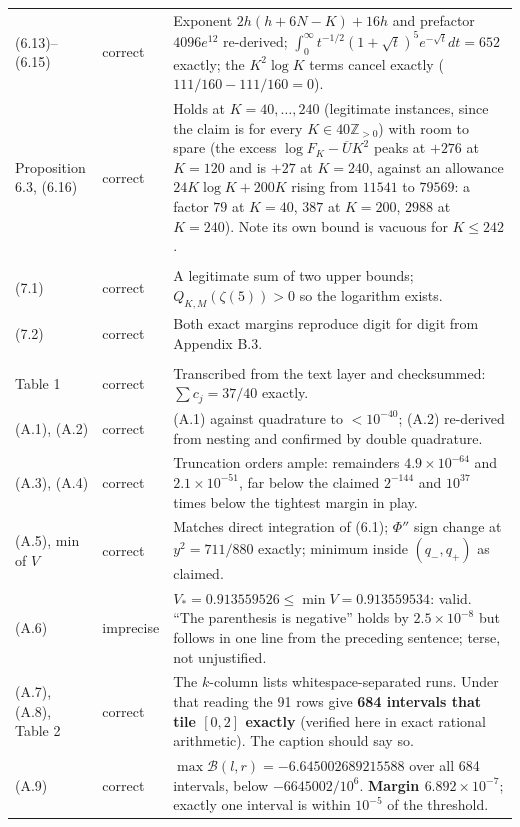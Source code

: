 \documentclass[11pt]{article}
\theoremstyle{definition}
\newcommand{\z}{\zeta(5)}
\newcommand{\Ub}{\overline{U}}
\newcommand{\OK}{correct}
\newcommand{\IM}{imprecise}
\begin{document}
\begin{longtable}{@{}p{2.55cm}p{1.75cm}p{9.5cm}@{}}
(6.13)--(6.15) & \OK & Exponent $2h(h{+}6N{-}K)+16h$ and prefactor $4096e^{12}$ re-derived; $\int_0^\infty t^{-1/2}(1+\sqrt t)^5e^{-\sqrt t}dt=652$ exactly; the $K^2\log K$ terms cancel exactly ($111/160-111/160=0$). \\
Proposition 6.3, (6.16) & \OK & Holds at $K=40,\dots,240$ (legitimate instances, since the claim is for every $K\in40\mathbb{Z}_{>0}$) with room to spare (the excess $\log F_K-\Ub K^2$ peaks at $+276$ at $K=120$ and is $+27$ at $K=240$, against an allowance $24K\log K+200K$ rising from $11541$ to $79569$: a factor $79$ at $K=40$, $387$ at $K=200$, $2988$ at $K=240$). Note its own bound is vacuous for $K\le242$. \\
\addlinespace
\multicolumn{3}{@{}l}{\textbf{Section 7}}\\
(7.1) & \OK & A legitimate sum of two upper bounds; $Q_{K,M}(\z)>0$ so the logarithm exists. \\
(7.2) & \OK & Both exact margins reproduce digit for digit from Appendix B.3. \\
\addlinespace
\multicolumn{3}{@{}l}{\textbf{Appendix A}}\\
Table 1 & \OK & Transcribed from the text layer and checksummed: $\sum c_j=37/40$ exactly. \\
(A.1), (A.2) & \OK & (A.1) against quadrature to $<10^{-40}$; (A.2) re-derived from nesting and confirmed by double quadrature. \\
(A.3), (A.4) & \OK & Truncation orders ample: remainders $4.9\times10^{-64}$ and $2.1\times10^{-51}$, far below the claimed $2^{-144}$ and $10^{37}$ times below the tightest margin in play. \\
(A.5), min of $V$ & \OK & Matches direct integration of (6.1); $\Phi''$ sign change at $y^2=711/880$ exactly; minimum inside $(q_-,q_+)$ as claimed. \\
(A.6) & \IM & $V_*=0.913559526\le\min V=0.913559534$: valid. ``The parenthesis is negative'' holds by $2.5\times10^{-8}$ but follows in one line from the preceding sentence; terse, not unjustified. \\
(A.7), (A.8), Table 2 & \OK & The $k$-column lists whitespace-separated runs. Under that reading the 91 rows give \textbf{684 intervals that tile $[0,2]$ exactly} (verified here in exact rational arithmetic). The caption should say so. \\
(A.9) & \OK & $\max\mathcal{B}(l,r)=-6.645002689215588$ over all 684 intervals, below $-6645002/10^6$. \textbf{Margin $6.892\times10^{-7}$}; exactly one interval is within $10^{-5}$ of the threshold. \\

\end{longtable}
\end{document}
